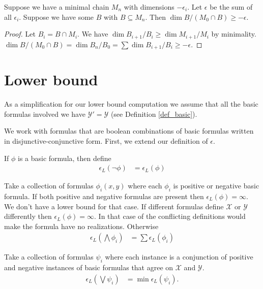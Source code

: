 \documentclass{amsart}
\newcommand{\X}{\mathcal X}
\newcommand{\Y}{\mathcal Y}
\begin{document}
\begin{Lemma} \label{chain_intersect}
  Suppose we have a minimal chain $M_n$ with dimensions $-\epsilon_i$.
  Let $\epsilon$ be the sum of all $\epsilon_i$.
  Suppose we have some $B$ with $B \subseteq M_n$.
  Then $\dim B / (M_0 \cap B) \geq -\epsilon$.
\end{Lemma}

\begin{proof}
  Let $B_i = B \cap M_i$.
  We have $\dim B_{i+1}/B_i \geq \dim M_{i+1}/M_i$ by minimality.
  $\dim B / (M_0 \cap B) = \dim B_n / B_0 = \sum \dim B_{i+1}/B_i \geq -\epsilon$.
\end{proof}

\section{Lower bound}

As a simplification for our lower bound computation we assume that all the basic formulas involved we have $\Y' = \Y$ (see Definition \ref{def_basic}).

We work with formulas that are boolean combinations of basic formulas written in disjunctive-conjunctive form.
First, we extend our definition of $\epsilon$.

\begin{Definition}[Negation]
  If $\phi$ is a basic formula, then define
  \begin{align*}
    \epsilon_L(\neg \phi) &= \epsilon_L(\phi)
  \end{align*}
\end{Definition}

\begin{Definition}[Conjunction]
  Take a collection of formulas $\phi_i(x, y)$ where each $\phi_i$ is positive or negative basic formula.
  If both positive and negative formulas are present then $\epsilon_L(\phi) = \infty$.
  We don't have a lower bound for that case.
  If different formulas define $\X$ or $\Y$ differently then $\epsilon_L(\phi) = \infty$.
  In that case of the conflicting definitions would make the formula have no realizations.
  Otherwise
  \begin{align*}
    \epsilon_L(\bigwedge \phi_i) &= \sum \epsilon_L(\phi_i)
  \end{align*}
\end{Definition}

\begin{Definition} [Disjunction]
  Take a collection of formulas $\psi_i$ where each instance is a conjunction of positive and negative instances of basic formulas that agree on $\X$ and $\Y$. %
  \begin{align*}
    \epsilon_L(\bigvee \psi_i) &= \min \epsilon_L(\psi_i).
  \end{align*}
\end{Definition}
\end{document}
